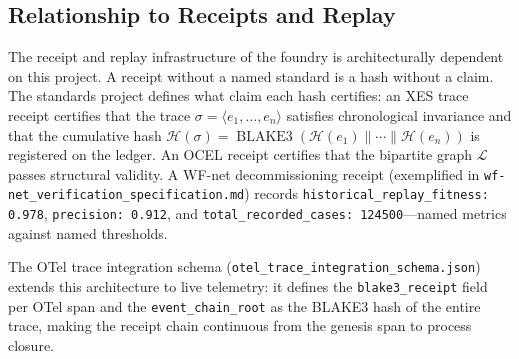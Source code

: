 \subsection{Relationship to Receipts and Replay}
\label{sec:standards-lineage-receipts}

The receipt and replay infrastructure of the foundry is architecturally dependent on this
project. A receipt without a named standard is a hash without a claim. The standards
project defines what claim each hash certifies: an XES trace receipt certifies that the
trace $\sigma = \langle e_1, \ldots, e_n \rangle$ satisfies chronological invariance and
that the cumulative hash $\mathcal{H}(\sigma) = \operatorname{BLAKE3}(\mathcal{H}(e_1)
\parallel \cdots \parallel \mathcal{H}(e_n))$ is registered on the ledger. An OCEL receipt
certifies that the bipartite graph $\mathcal{L}$ passes structural validity. A WF-net
decommissioning receipt (exemplified in \texttt{wf-net\_verification\_specification.md})
records \texttt{historical\_replay\_fitness: 0.978}, \texttt{precision: 0.912}, and
\texttt{total\_recorded\_cases: 124500}---named metrics against named thresholds.

The OTel trace integration schema (\texttt{otel\_trace\_integration\_schema.json}) extends
this architecture to live telemetry: it defines the \texttt{blake3\_receipt} field per
OTel span and the \texttt{event\_chain\_root} as the BLAKE3 hash of the entire trace,
making the receipt chain continuous from the genesis span to process closure.
